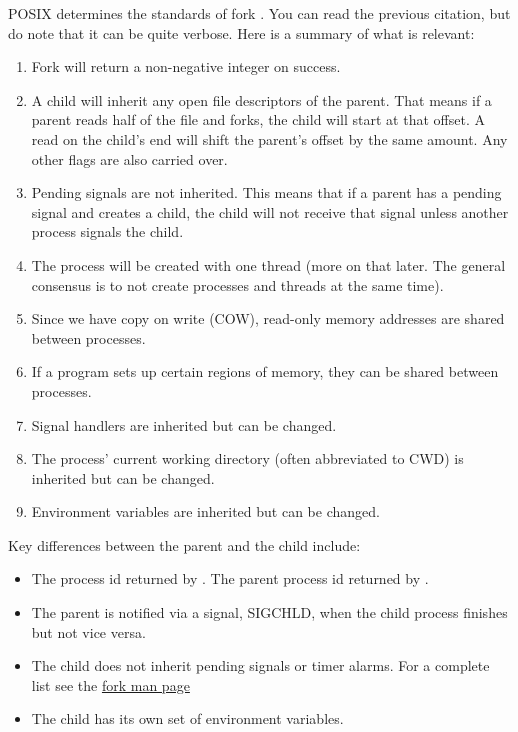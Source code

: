 POSIX determines the standards of fork \cite{fork_2018}.
You can read the previous citation, but do note that it can be quite verbose.
Here is a summary of what is relevant:

\begin{enumerate}
    \item Fork will return a non-negative integer on success.
    \item A child will inherit any open file descriptors of the parent.
          That means if a parent reads half of the file and forks, the child will start at that offset.
          A read on the child's end will shift the parent's offset by the same amount.
          Any other flags are also carried over.
    \item Pending signals are not inherited.
          This means that if a parent has a pending signal and creates a child, the child will not receive that signal unless another process signals the child.
    \item The process will be created with one thread (more on that later. The general consensus is to not create processes and threads at the same time).
    \item Since we have copy on write (COW), read-only memory addresses are shared between processes.
    \item If a program sets up certain regions of memory, they can be shared between processes.
    \item Signal handlers are inherited but can be changed.
    \item The process' current working directory (often abbreviated to CWD) is inherited but can be changed.
    \item Environment variables are inherited but can be changed.
\end{enumerate}

Key differences between the parent and the child include:
\begin{itemize}
    \item The process id returned by .
          The parent process id returned by .
    \item The parent is notified via a signal, SIGCHLD, when the child process finishes but not vice versa.
    \item The child does not inherit pending signals or timer alarms.
          For a complete list see the \href{http://man7.org/linux/man-pages/man2/fork.2.html}{fork man page}
    \item The child has its own set of environment variables.
\end{itemize}

